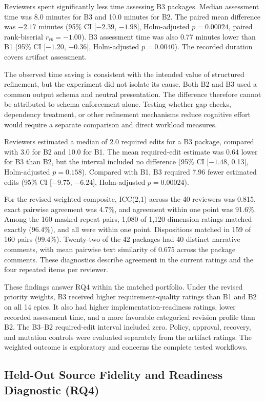 \documentclass[pdflatex,sn-basic]{sn-jnl}
\begin{document}
Reviewers spent significantly less time assessing B3 packages. Median assessment time was 8.0 minutes for B3 and 10.0 minutes for B2. The paired mean difference was $-2.17$ minutes (95\% CI [$-2.39$, $-1.98$], Holm-adjusted $p=0.00024$, paired rank-biserial $r_{rb}=-1.00$). B3 assessment time was also 0.77 minutes lower than B1 (95\% CI [$-1.20$, $-0.36$], Holm-adjusted $p=0.0040$). The recorded duration covers artifact assessment.

The observed time saving is consistent with the intended value of structured refinement, but the experiment did not isolate its cause. Both B2 and B3 used a common output schema and neutral presentation. The difference therefore cannot be attributed to schema enforcement alone. Testing whether gap checks, dependency treatment, or other refinement mechanisms reduce cognitive effort would require a separate comparison and direct workload measures.

Reviewers estimated a median of 2.0 required edits for a B3 package, compared with 3.0 for B2 and 10.0 for B1. The mean required-edit estimate was 0.64 lower for B3 than B2, but the interval included no difference (95\% CI [$-1.48$, 0.13], Holm-adjusted $p=0.158$). Compared with B1, B3 required 7.96 fewer estimated edits (95\% CI [$-9.75$, $-6.24$], Holm-adjusted $p=0.00024$).

For the revised weighted composite, ICC(2,1) across the 40 reviewers was 0.815, exact pairwise agreement was 4.7\%, and agreement within one point was 91.6\%. Among the 160 masked-repeat pairs, 1,080 of 1,120 dimension ratings matched exactly (96.4\%), and all were within one point. Dispositions matched in 159 of 160 pairs (99.4\%). Twenty-two of the 42 packages had 40 distinct narrative comments, with mean pairwise text similarity of 0.675 across the package comments. These diagnostics describe agreement in the current ratings and the four repeated items per reviewer.

These findings answer RQ4 within the matched portfolio. Under the revised priority weights, B3 received higher requirement-quality ratings than B1 and B2 on all 14 epics. It also had higher implementation-readiness ratings, lower recorded assessment time, and a more favorable categorical revision profile than B2. The B3--B2 required-edit interval included zero. Policy, approval, recovery, and mutation controls were evaluated separately from the artifact ratings. The weighted outcome is exploratory and concerns the complete tested workflows.

\subsection{Held-Out Source Fidelity and Readiness Diagnostic (RQ4)}\label{sec:heldout-source-diagnostic}
\end{document}
